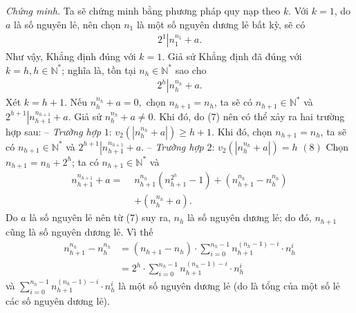\begin{multicols}{2}
	\vskip 0.05cm 
	\textit{Chứng minh.} Ta sẽ chứng minh bằng phương pháp quy nạp theo $k$.
	\vskip 0.05cm
	Với $k = 1$, do $a$ là số nguyên lẻ, nên chọn $n_1$  là một số nguyên dương lẻ bất kỳ, sẽ có
	\begin{align*}
		{2^1}\left| {n_1^{{n_1}} + a} \right..
	\end{align*}
	Như vậy, Khẳng định đúng với $k = 1$.
	\vskip 0.05cm
	Giả sử Khẳng định đã đúng với $k \!=\! h, h \!\in\! \mathbb{N^*}$;  nghĩa là, tồn tại $n_h \in\mathbb{N^*}$  sao cho
	\begin{align*}
		{2^h}\left| {n_h^{{n_h}} + a} \right.. \tag{$7$}
	\end{align*}
	Xét $k = h + 1$.
	\vskip 0.05cm
	Nếu $n_h^{{n_h}} + a = 0,$  chọn  ${n_{h + 1}} = {n_h}$, ta sẽ có ${n_{h + 1}} \in \mathbb{N^*}$  và  ${2^{h + 1}}\left| {n_{h + 1}^{{n_{h + 1}}} + a} \right.$.
	\vskip 0.05cm
	Giả sử $n_h^{{n_h}} + a \ne 0.$  Khi đó, do ($7$) nên có thể xảy ra hai trường hợp sau:
	\vskip 0.05cm
	-- \textit{Trường hợp} $1$: ${v_2}\left( {\left| {n_h^{{n_h}} + a} \right|} \right) \ge h + 1.$
	\vskip 0.05cm  
	Khi đó, chọn  ${n_{h + 1}} = {n_h}$, ta sẽ có ${n_{h + 1}} \in \mathbb{N^*}$   và  ${2^{h + 1}}\left| {n_{h + 1}^{{n_{h + 1}}} + a} \right.$.
	\vskip 0.05cm
	-- \textit{Trường hợp} $2$:  ${v_2}\left( {\left| {n_h^{{n_h}} + a} \right|} \right) = h$                                                                                                        \hfill $(8)$
	\vskip 0.05cm
	Chọn  ${n_{h + 1}} = {n_h} + {2^h}$; ta có  ${n_{h + 1}} \in \mathbb{N^*}$  và
	\begin{align*}
		n_{h + 1}^{{n_{h + 1}}} + a = \,\,&n_{h + 1}^{{n_h}}\left( {n_{h + 1}^{{2^h}} - 1} \right) + \left( {n_{h + 1}^{{n_h}} - n_h^{{n_h}}} \right) \\
		&+ \left( {n_h^{{n_h}} + a} \right). \tag{$9$}
	\end{align*}
	Do $a$ là số nguyên lẻ nên từ ($7$) suy ra, $n_h$  là số nguyên dương lẻ; do đó, $n_{h+1}$  cũng là số nguyên dương lẻ. Vì thế
	\begin{align*}
		n_{h + 1}^{{n_h}} - n_h^{{n_h}} &= \left( {{n_{h + 1}} - {n_h}} \right) \cdot \sum\limits_{i = 0}^{{n_h} - 1} {n_{h + 1}^{\left( {{n_h} - 1} \right) - i} \cdot n_h^i}  \\
		&= {2^h} \cdot \sum\limits_{i = 0}^{{n_h} - 1} {n_{h + 1}^{\left( {{n_h} - 1} \right) - i} \cdot n_h^i}
	\end{align*}
	và $\sum\limits_{i = 0}^{{n_h} - 1} {n_{h + 1}^{\left( {{n_h} - 1} \right) - i} \cdot n_h^i}$  là một số nguyên dương lẻ (do là tổng của một số lẻ các số nguyên dương lẻ).

\end{multicols}
